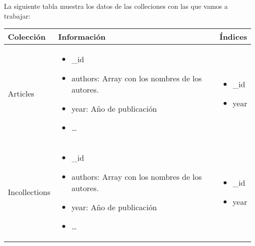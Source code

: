 La siguiente tabla muestra los datos de las colleciones con las que vamos a trabajar:

\begin{center}
  \begin{tabular}{ | l | l | l |}
    \hline
    Colección & Información  &  Índices \\ \hline
    
    Articles &
    \begin{minipage}[t]{0.6\textwidth}
      \begin{itemize}
	\item \_id
	\item authors: Array con los nombres de los autores.
	\item year: Año de publicación
	\item \ldots
      \end{itemize}
    \end{minipage} & 
    \begin{minipage}[t]{0.1\textwidth}
      \begin{itemize}
	\item \_id
	\item year
      \end{itemize} 
    \end{minipage}  \\ \hline
    
    Incollections &
    \begin{minipage}[t]{0.6\textwidth}
      \begin{itemize}
	\item \_id
	\item authors: Array con los nombres de los autores.
	\item year: Año de publicación
	\item \ldots
      \end{itemize}
    \end{minipage} & 
    \begin{minipage}[t]{0.1\textwidth}
      \begin{itemize}
	\item \_id
	\item year
      \end{itemize}
    \end{minipage}  \\ \hline
    

\end{tabular}
\end{center}
